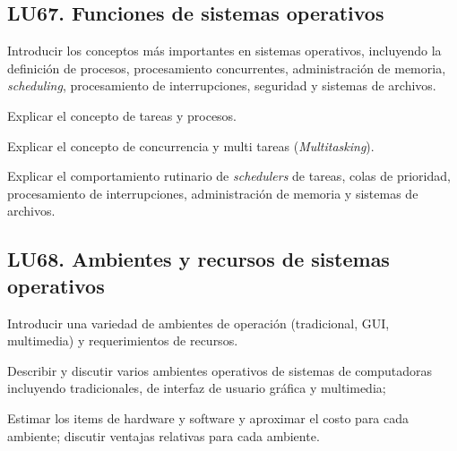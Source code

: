 \subsection{LU67. Funciones de sistemas operativos}\label{sec:BOK-LU67}\label{sec:LU67}
\begin{LearningUnit}
\begin{LUGoal}
\item Introducir los conceptos más importantes en sistemas operativos, incluyendo la definición de procesos, procesamiento concurrentes, administración de memoria, \textit{scheduling}, procesamiento de interrupciones, seguridad y sistemas de archivos.
\end{LUGoal}

\begin{LUObjective}
\item Explicar el concepto de tareas y procesos.
\item Explicar el concepto de concurrencia y multi tareas (\textit{Multitasking}).
\item Explicar el comportamiento rutinario de \textit{schedulers} de tareas, colas de prioridad, procesamiento de interrupciones, administración de memoria y sistemas de archivos.
\end{LUObjective}
\end{LearningUnit}

\subsection{LU68. Ambientes y recursos de sistemas operativos}\label{sec:BOK-LU68}\label{sec:LU68}
\begin{LearningUnit}
\begin{LUGoal}
\item Introducir una variedad de ambientes de operación (tradicional, GUI, multimedia) y requerimientos de recursos.
\end{LUGoal}

\begin{LUObjective}
\item Describir y discutir varios ambientes operativos de sistemas de computadoras incluyendo tradicionales, de interfaz de usuario gráfica y multimedia;
\item Estimar los items de hardware y software y aproximar el costo para cada ambiente; discutir ventajas relativas para cada ambiente.
\end{LUObjective}
\end{LearningUnit}

